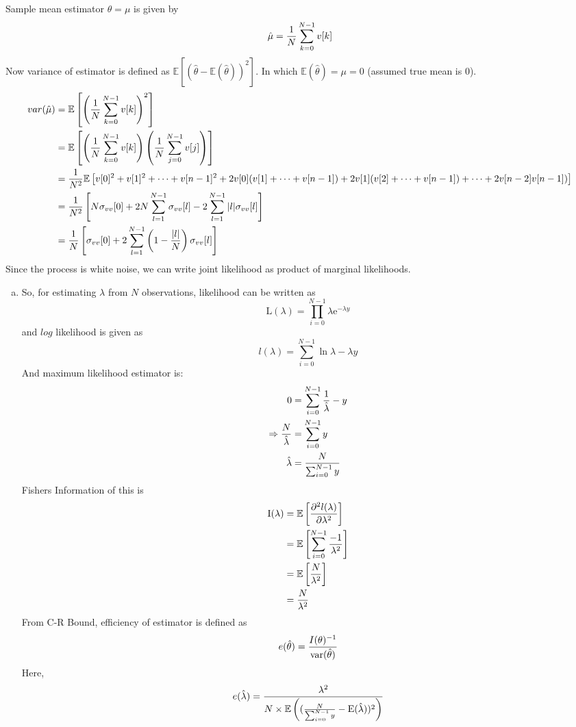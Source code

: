 \documentclass[11pt,paper=a4,answers]{exam}
\newcommand{\lh}[0]{\hat{\lambda}}
\begin{document}
\begin{questions}
\question Sample mean estimator $\theta = \mu$ is given by
$$ \hat{\mu} = {1 \over N} \sum_{k=0}^{N-1} v[k] $$
Now variance of estimator is defined as $\mathbb{E}[ (\hat{\theta} - \mathbb{E}(\hat{\theta}))^2 ]$. In which $\mathbb{E}(\hat{\theta}) = \mu = 0$ (assumed true mean is $0$).
\begin{align*}
    var(\hat{\mu}) &= \mathbb{E} \left[ \left({1 \over N} \sum_{k=0}^{N-1} v[k] \right)^2\right ] \\
    &= \mathbb{E} \left[ \left({1 \over N} \sum_{k=0}^{N-1} v[k] \right) \left({1 \over N} \sum_{j=0}^{N-1} v[j] \right)\right ]\\
    &= {1 \over N^2} \mathbb{E} \left[ v[0]^2 + v[1]^2+\cdots+v[n-1]^2 + 2v[0](v[1] +\cdots + v[n-1]) + 2v[1](v[2]+ \cdots + v[n-1]) + \cdots + 2v[n-2]v[n-1])  \right]\\
    &= {1 \over N^2} \left[ N \sigma_{vv}[0] + 2N \sum_{l=1}^{N-1} \sigma_{vv}[l] - 2 \sum_{l=1}^{N-1} |l| \sigma_{vv}[l]\right] \\
    &= {1 \over N} \left[ \sigma_{vv}[0] + 2 \sum_{l=1}^{N-1} \left(1 - {|l| \over N}\right)\sigma_{vv}[l]\right]
\end{align*}
\question Since the process is white noise, we can write joint likelihood as product of marginal likelihoods.
\begin{enumerate}[a.]
    \item  So, for estimating $\lambda$ from $N$ observations, likelihood can be written as
$$\mathrm{L}(\lambda) = \prod _{i=0}^{N-1} \lambda \mathrm{e} ^{-\lambda y}$$
and $log$ likelihood is given as
$$ l(\lambda) = \sum_{i=0}^{N-1} \ln \lambda -\lambda y$$
And maximum likelihood estimator is:
\begin{align}
    0 &= \sum_{i=0}^{N-1} {1 \over \lh} - y \\
    \Rightarrow {N \over \lh} &= \sum_{i=0}^{N-1} y\\
    \lh &= {N \over \sum_{i=0}^{N-1} y}
\end{align}
Fishers Information of this is
\begin{align*}
    \mathrm{I}(\lambda) &= \mathbb{E}\left[\frac{\partial ^2 l(\lambda)}{\partial \lambda ^2} \right] \\
    &= \mathbb{E} \left[\sum_{i=0}^{N-1} {-1 \over \lambda ^2} \right] \\
    &= \mathbb{E} \left[ {N \over \lambda ^2} \right] \\
    &= {N \over \lambda ^2}
\end{align*}
From C-R Bound, efficiency of estimator is defined as 
$$e(\hat{\theta}) = \frac{I(\theta)^{-1}}{{\rm var}(\hat{\theta})}$$
Here, 
\begin{align*}
    e(\hat{\lambda}) = \frac{\lambda ^2}{N \times \mathbb{E}\left(({N \over \sum_{i=0}^{N-1} y} - \mathrm{E}(\hat{\lambda}))^2\right)}
\end{align*}



\end{enumerate}
\end{questions}
\end{document}

